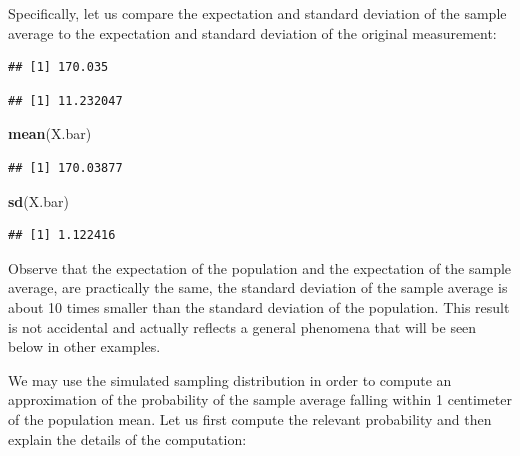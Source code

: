 \documentclass[]{krantz}
\makeatletter
\newenvironment{Shaded}{\begin{snugshade}}{\end{snugshade}}
\newcommand{\KeywordTok}[1]{\textcolor[rgb]{0.13,0.29,0.53}{\textbf{#1}}}
\newcommand{\DecValTok}[1]{\textcolor[rgb]{0.00,0.00,0.81}{#1}}
\newcommand{\OperatorTok}[1]{\textcolor[rgb]{0.81,0.36,0.00}{\textbf{#1}}}
\newcommand{\NormalTok}[1]{#1}
\newenvironment{kframe}{%
\medskip{}
\setlength{\fboxsep}{.8em}
 \def\at@end@of@kframe{}%
 \ifinner\ifhmode%
  \def\at@end@of@kframe{\end{minipage}}%
  \begin{minipage}{\columnwidth}%
 \fi\fi%
 \def\FrameCommand##1{\hskip\@totalleftmargin \hskip-\fboxsep
 \colorbox{shadecolor}{##1}\hskip-\fboxsep
     \hskip-\linewidth \hskip-\@totalleftmargin \hskip\columnwidth}%
 \MakeFramed {\advance\hsize-\width
   \@totalleftmargin\z@ \linewidth\hsize
   \@setminipage}}%
 {\par\unskip\endMakeFramed%
 \at@end@of@kframe}
\renewenvironment{Shaded}{\begin{kframe}}{\end{kframe}}
\theoremstyle{definition}
\theoremstyle{definition}
\theoremstyle{definition}
\theoremstyle{remark}
\makeatother
\begin{document}
Specifically, let us compare the expectation and standard deviation of
the sample average to the expectation and standard deviation of the
original measurement:

\begin{Shaded}
\end{Shaded}

\begin{verbatim}
## [1] 170.035
\end{verbatim}

\begin{Shaded}
\end{Shaded}

\begin{verbatim}
## [1] 11.232047
\end{verbatim}

\begin{Shaded}
\begin{Highlighting}[]
\KeywordTok{mean}\NormalTok{(X.bar)}
\end{Highlighting}
\end{Shaded}

\begin{verbatim}
## [1] 170.03877
\end{verbatim}

\begin{Shaded}
\begin{Highlighting}[]
\KeywordTok{sd}\NormalTok{(X.bar)}
\end{Highlighting}
\end{Shaded}

\begin{verbatim}
## [1] 1.122416
\end{verbatim}

Observe that the expectation of the population and the expectation of
the sample average, are practically the same, the standard deviation of
the sample average is about 10 times smaller than the standard deviation
of the population. This result is not accidental and actually reflects a
general phenomena that will be seen below in other examples.

We may use the simulated sampling distribution in order to compute an
approximation of the probability of the sample average falling within 1
centimeter of the population mean. Let us first compute the relevant
probability and then explain the details of the computation:
\end{document}
